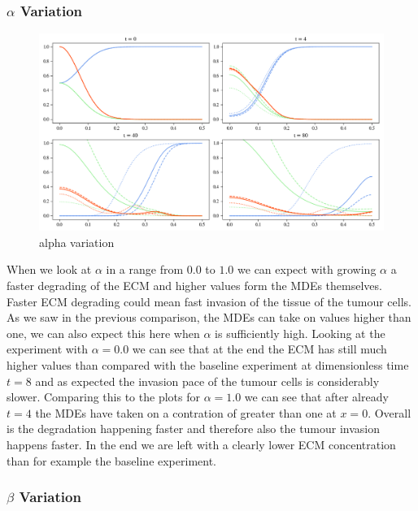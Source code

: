\subsubsection*{$\alpha$ Variation}
\begin{figure}[h]
    \centering
    \includegraphics[width=\textwidth]{resources/images/alpha_variation.png}
    \caption{alpha variation}
    \label{fig:alpha_variation}
\end{figure}
When we look at $\alpha$ in a range from $0.0$ to $1.0$ we can expect with growing $\alpha$ a faster degrading of the ECM and higher values form the MDEs themselves. Faster ECM degrading could mean fast invasion of the tissue of the tumour cells. As we saw in the previous comparison, the MDEs can take on values higher than one, we can also expect this here when $\alpha$ is sufficiently high. 
Looking at the experiment with $\alpha=0.0$ we can see that at the end the ECM has still much higher values than compared with the baseline experiment at dimensionless time $t=8$ and as expected the invasion pace of the tumour cells is considerably slower. 
Comparing this to the plots for $\alpha=1.0$ we can see that after already $t=4$ the MDEs have taken on a contration of greater than one at $x=0$. Overall is the degradation happening faster and therefore also the tumour invasion happens faster. In the end we are left with a clearly lower ECM concentration than for example the baseline experiment. 

\subsubsection*{$\beta$ Variation}

